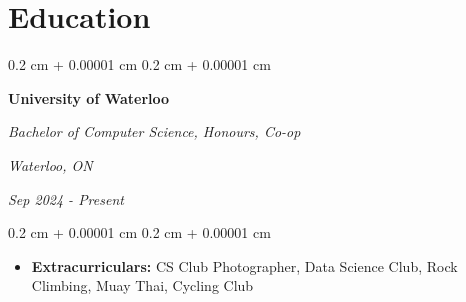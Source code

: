 \documentclass[10pt, letterpaper]{article}
\newenvironment{highlights}{
    \begin{itemize}[
        topsep=0.10 cm,
        parsep=0.10 cm,
        partopsep=0pt,
        itemsep=0pt,
        leftmargin=0.4 cm + 10pt
    ]
}{
    \end{itemize}
} %
\newenvironment{highlightsforbulletentries}{
    \begin{itemize}[
        topsep=0.10 cm,
        parsep=0.10 cm,
        partopsep=0pt,
        itemsep=0pt,
        leftmargin=10pt
    ]
}{
    \end{itemize}
} %
\newenvironment{onecolentry}{
    \begin{adjustwidth}{
        0.2 cm + 0.00001 cm
    }{
        0.2 cm + 0.00001 cm
    }
}{
    \end{adjustwidth}
} %
\newenvironment{twocolentry}[2][]{
    \onecolentry
    \def\secondColumn{#2}
    \setcolumnwidth{\fill, 4.5 cm}
    \begin{paracol}{2}
}{
    \switchcolumn \raggedleft \secondColumn
    \end{paracol}
    \endonecolentry
} %
\let\hrefWithoutArrow\href
\renewcommand{\href}[2]{\hrefWithoutArrow{#1}{\ifthenelse{\equal{#2}{}}{ }{#2 }\raisebox{.15ex}{\footnotesize \faExternalLink*}}}
\begin{document}










    \section{Education}
        
        \begin{twocolentry}{
    
        \textit{Waterloo, ON}
            
        \textit{Sep 2024 - Present}}
            \textbf{University of Waterloo}

           \textit{Bachelor of Computer Science, Honours, Co-op}
        \end{twocolentry}

        \vspace{0.10 cm}
        \begin{onecolentry}
            \begin{highlights}
                \item \textbf{Extracurriculars:} CS Club Photographer, Data Science Club, Rock Climbing, Muay Thai, Cycling Club
            \end{highlights}
        \end{onecolentry}
\end{document}
